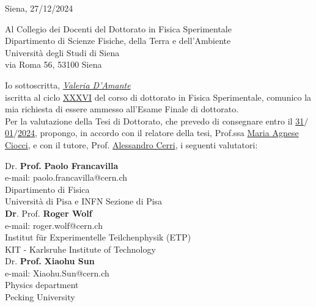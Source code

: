 \documentclass[12pt,a4paper,oneside]{extarticle}
\begin{document}
\pagestyle{default_page}
\begin{flushright}
Siena, 27/12/2024
\end{flushright}

Al Collegio dei Docenti del Dottorato in Fisica Sperimentale\\

Dipartimento di Scienze Fisiche, della Terra e dell'Ambiente\\

Università degli Studi di Siena\\

via Roma 56, 53100 Siena\\
\vspace{1cm}

\noindent Io sottoscritta, \textit{\underline{Valeria D'Amante}}\\

\noindent iscritta al ciclo \underline{XXXVI} del corso di dottorato in Fisica Sperimentale, comunico la mia richiesta di essere ammesso all'Esame Finale di dottorato.\\

\noindent Per la valutazione della Tesi di Dottorato, che prevedo di consegnare entro il \underline{31}$/$\underline{01}$/$\underline{2024}, propongo, in accordo con il relatore della tesi, Prof.ssa \underline{Maria Agnese Ciocci}, e con il tutore, Prof. \underline{Alessandro Cerri}, i seguenti valutatori:\\
\vspace{1cm}

\noindent \makebox[0pt][l]{$\square$}{ } \hspace{2mm}Dr. \/ \makebox[0pt][l]{$\square$}{$\times$} \textbf{Prof.} \textbf{Paolo Francavilla}\\
e-mail: paolo.francavilla@cern.ch \\
Dipartimento di Fisica \\
Università di Pisa e INFN Sezione di Pisa\\

\vspace{1cm}
\noindent\makebox[0pt][l]{$\square$}{$\times$}\textbf{Dr}. \/ \makebox[0pt][l]{$\square$}{ } \hspace{2mm} Prof. \textbf{Roger Wolf}\\
e-mail: roger.wolf@cern.ch \\
Institut für Experimentelle Teilchenphysik (ETP) \\
KIT - Karlsruhe Institute of Technology \\

\vspace{1cm}
\noindent \makebox[0pt][l]{$\square$}{ } \hspace{2mm} Dr. \/ \makebox[0pt][l]{$\square$}{$\times$} \textbf{Prof.} \textbf{Xiaohu Sun}\\
e-mail: Xiaohu.Sun@cern.ch\\
Physics department \\
Pecking University \\
\end{document}
